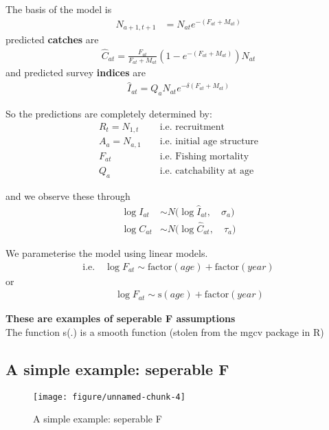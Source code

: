 \documentclass[a4paper]{article}\usepackage{graphicx, color}
\makeatletter
\def\maxwidth{ %
  \ifdim\Gin@nat@width>\linewidth
    \linewidth
  \else
    \Gin@nat@width
  \fi
}
\newenvironment{knitrout}{}{} %
\makeatother
\begin{document}
The basis of the model is
\begin{align*}
  N_{a+1,t+1} &= N_{at} e^{-(F_{at}+M_{at})}
\end{align*}
predicted \textbf{catches} are
\begin{align*}
  \hat{C}_{at} = \frac{F_{at}}{F_{at}+M_{at}}\left(1-e^{-(F_{at}+M_{at})}\right) N_{at}
\end{align*}
and predicted survey \textbf{indices} are
\begin{align*}
  \hat{I}_{at} = Q_{a} N_{at} e^{-\delta ( F_{at}+M_{at})}
\end{align*}


So the predictions are completely determined by:
\begin{align*}
  R_t = N_{1,t} \quad &\text{i.e. recruitment} \\
  A_a = N_{a,1} \quad &\text{i.e. initial age structure} \\
  F_{at} \phantom{= N_{a,1}} \quad &\text{i.e. Fishing mortality} \\
  Q_a \phantom{= N_{a,1}} \quad &\text{i.e. catchability at age}
\end{align*}

and we observe these through
\begin{align*}
  \log I_{at} &\sim N \Bigg( \log \hat{I}_{at}, \quad \sigma_a  \Bigg) \\
  \log C_{at} &\sim N \Bigg( \log \hat{C}_{at}, \quad \tau_a  \Bigg)
\end{align*}


We parameterise the model using linear models.
\begin{align*}
  \text{i.e.} \quad \log F_{at} \sim \text{factor}(age) + \text{factor}(year)
\end{align*}
or
\begin{align*}
  \phantom{\text{i.e.}} \quad \log F_{at} \sim \text{s}(age) + \text{factor}(year)
\end{align*}

\bigskip
\textbf{These are examples of seperable F assumptions} \\
\medskip
The function s(.) is a smooth function (stolen from the mgcv package in R)


\subsection*{A simple example: seperable F}



\begin{knitrout}
\color{fgcolor}\begin{figure}[H]


{\centering \texttt{[image: figure/unnamed-chunk-4]} 

}

\caption[A simple example]{A simple example: seperable F\label{fig:unnamed-chunk-4}}
\end{figure}

\end{knitrout}
\end{document}

